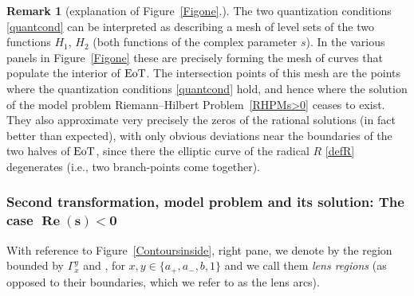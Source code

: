 \documentclass[10pt,a4paper]{amsart}
\numberwithin{equation}{section}
\theoremstyle{definition}
\newtheorem{Remark}[Theorem]{Remark}
\def \scr{\mathscr}
\def \Re{\operatorname{Re} }
\begin{document}
\begin{Remark}[explanation of Figure~\ref{Figone}.]
\label{remexp2}
The two quantization conditions \eqref{quantcond} can be interpreted as describing a mesh of level sets of the two functions $H_1$, $H_2$ (both functions of the complex parameter $s$). In the various panels in Figure~\ref{Figone} these are precisely forming the mesh of curves that populate the interior of ${\rm EoT}$. The intersection points of this mesh are the points where the quantization conditions \eqref{quantcond} hold, and hence where the solution of the model problem Riemann--Hilbert Problem~\ref{RHPMs>0} ceases to exist. They also approximate very precisely the zeros of the rational solutions (in fact better than expected), with only obvious deviations near the boundaries of the two halves of ${\rm EoT}$, since there the elliptic curve of the radical $R$ \eqref{defR} degenerates (i.e., two branch-points come together).
\end{Remark}


\subsubsection[Second transformation, model problem and its solution: The case $\Re (s)<0$]{Second transformation, model problem and its solution: The case $\boldsymbol{\Re (s)<0}$}
\label{secmodels<0}

 With reference to Figure~\ref{Contoursinside}, right pane, we denote by  the region bounded by $\Gamma_x^y$ and \smash{$\scr L_\pm^{(x,y)}$}, for $x,y\in \{a_+,a_-,b,1\}$ and we call them {\it lens regions} (as opposed to their boundaries, which we refer to as the lens arcs).
\end{document}
